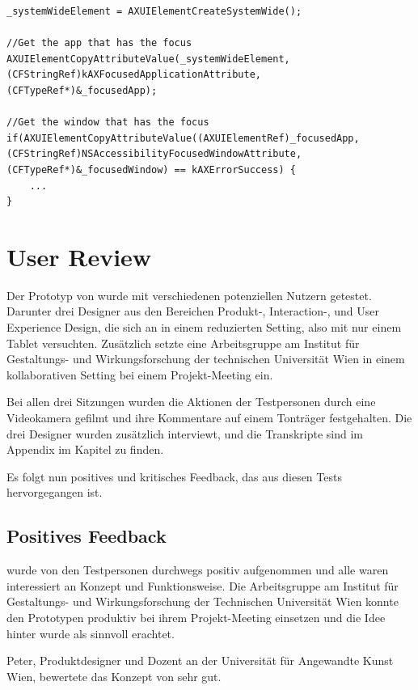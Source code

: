 \begin{lstlisting}[float,caption=Laden von Accessibility Daten,label=lst:accessiblityDaten]
_systemWideElement = AXUIElementCreateSystemWide();
	
//Get the app that has the focus
AXUIElementCopyAttributeValue(_systemWideElement, (CFStringRef)kAXFocusedApplicationAttribute, (CFTypeRef*)&_focusedApp);

//Get the window that has the focus
if(AXUIElementCopyAttributeValue((AXUIElementRef)_focusedApp, (CFStringRef)NSAccessibilityFocusedWindowAttribute, (CFTypeRef*)&_focusedWindow) == kAXErrorSuccess) {
    ...
}		
\end{lstlisting}

\section{User Review} \label{sec:userReview} 
Der Prototyp von \scribbler wurde mit verschiedenen potenziellen Nutzern getestet. Darunter drei Designer aus den Bereichen Produkt-, Interaction-, und User Experience Design, die sich an \scribbler in einem reduzierten Setting, also mit nur einem Tablet versuchten. Zusätzlich setzte eine Arbeitsgruppe am Institut für Gestaltungs- und Wirkungsforschung der technischen Universität Wien \scribbler in einem kollaborativen Setting bei einem Projekt-Meeting ein. 

Bei allen drei Sitzungen wurden die Aktionen der Testpersonen durch eine Videokamera gefilmt und ihre Kommentare auf einem Tonträger festgehalten. Die drei Designer wurden zusätzlich interviewt, und die Transkripte sind im Appendix im Kapitel  zu finden.

Es folgt nun positives und kritisches Feedback, das aus diesen Tests hervorgegangen ist.

\subsection{Positives Feedback}

\scribbler wurde von den Testpersonen durchwegs positiv aufgenommen und alle waren interessiert an Konzept und Funktionsweise. Die Arbeitsgruppe am Institut für Gestaltungs- und Wirkungsforschung der Technischen Universität Wien konnte den Prototypen produktiv bei ihrem Projekt-Meeting einsetzen und die Idee hinter \scribbler wurde als sinnvoll erachtet. 

Peter, Produktdesigner und Dozent an der Universität für Angewandte Kunst Wien, bewertete das Konzept von \scribbler sehr gut.

